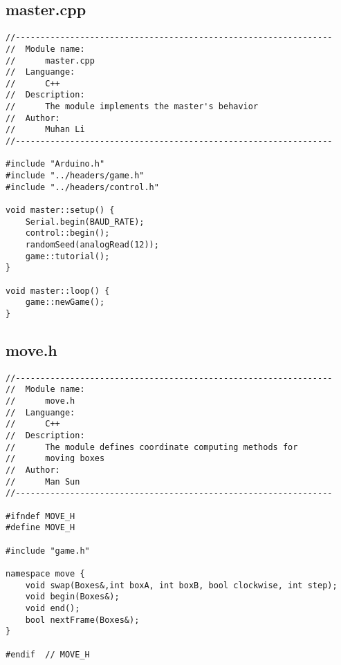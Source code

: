 \subsection{master.cpp}
\begin{verbatim}
//----------------------------------------------------------------
//  Module name:
//      master.cpp
//  Languange:
//      C++
//  Description:
//      The module implements the master's behavior
//  Author:
//      Muhan Li
//----------------------------------------------------------------

#include "Arduino.h"
#include "../headers/game.h"
#include "../headers/control.h"

void master::setup() {
    Serial.begin(BAUD_RATE);
    control::begin();
    randomSeed(analogRead(12));
    game::tutorial();
}

void master::loop() {
    game::newGame();
}
\end{verbatim}

\subsection{move.h}
\begin{verbatim}
//----------------------------------------------------------------
//  Module name:
//      move.h
//  Languange:
//      C++
//  Description:
//      The module defines coordinate computing methods for 
//      moving boxes
//  Author:
//      Man Sun
//----------------------------------------------------------------

#ifndef MOVE_H
#define MOVE_H

#include "game.h"

namespace move {
    void swap(Boxes&,int boxA, int boxB, bool clockwise, int step);
    void begin(Boxes&);
    void end();
    bool nextFrame(Boxes&);
}

#endif  // MOVE_H
\end{verbatim}

